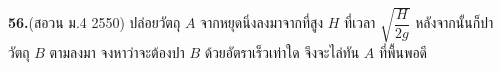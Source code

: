 \par\noindent\textbf{56.}\quad (สอวน ม.4 2550) ปล่อยวัตถุ $A$ จากหยุดนิ่งลงมาจากที่สูง $H$ ที่เวลา $\sqrt{\dfrac{H}{2g}}$ หลังจากนั้นก็ปาวัตถุ $B$ ตามลงมา จงหาว่าจะต้องปา $B$ ด้วยอัตราเร็วเท่าใด จึงจะไล่ทัน $A$ ที่พื้นพอดี\par\medskip
